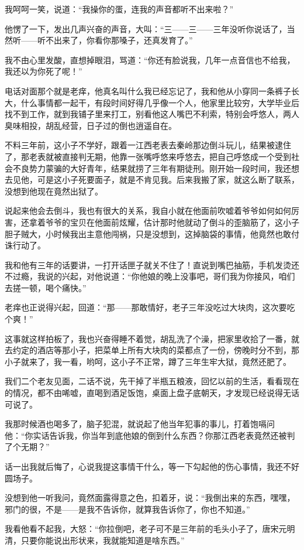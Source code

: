我呵呵一笑，说道：“我操你的蛋，连我的声音都听不出来啦？”

他愣了一下，发出几声兴奋的声音，大叫：“三——三——三年没听你说话了，当然听——听不出来了，你看你那嗓子，还真发育了。”

我不由心里发酸，直想掉眼泪，骂道：“你还有脸说我，几年一点音信也不给我，我还以为你死了呢！”

电话对面那个就是老痒，他真名叫什么我已经忘记了，我和他从小穿同一条裤子长大，什么事情都一起干，有段时间好得几乎像一个人，他家里比较穷，大学毕业后找不到工作，就到我铺子里来打工，别看他这人嘴巴不利索，特别会呼悠人，两人臭味相投，胡乱经营，日子过的倒也逍遥自在。

不料三年前，这小子不学好，跟着一江西老表去秦岭那边倒斗玩儿，结果被逮住了，那老表就被直接判无期，他靠一张嘴呼悠来呼悠去，把自己呼悠成一个受到社会不良势力蒙骗的大好青年，结果就捞了三年有期徒刑。刚开始一段时间，我还想去见他，可是这小子死要面子，就是不肯见我。后来我搬了家，就这么断了联系，没想到他现在竟然出狱了。

说起来他会去倒斗，我也有很大的关系，我自小就在他面前吹嘘着爷爷如何如何厉害，还拿着爷爷的宝贝在他面前炫耀，估计那时他就动了倒斗的歪脑筋了，这小子胆子贼大，小时候我出主意他闯祸，只是没想到，这掉脑袋的事情，他竟然也敢付诛行动了。

我和他有三年的话要讲，一打开话匣子就关不住了！直说到嘴巴抽筋，手机发烫还不过瘾，我说的兴起，对他说道：“你他娘的晚上没事吧，哥们我为你接风，咱们去搓一顿，喝个痛快。”

老痒也正说得兴起，回道：“那——那敢情好，老子三年没吃过大块肉，这次要吃个爽！”

这事就这样拍板了，我也兴奋得睡不着觉，胡乱洗了个澡，把家里收拾了一番，就去约定的酒店等那小子，把菜单上所有大块肉的菜都点了一份，傍晚时分不到，那小子就来了，我一看，哟呵，这小子不正常，蹲了三年生牢大狱，竟然还肥了。

我们二个老友见面，二话不说，先干掉了半瓶五粮液，回忆以前的生活，看看现在的情况，都不由唏嘘，直喝到酒足饭饱，桌面上盘子底朝天，才发现已经说得无话可说了。

我那时候酒也喝多了，脑子犯混，就说起了他当年犯事的事儿，打着饱嗝问他：“你实话告诉我，你当年到底他娘的倒到什么东西？你那江西老表竟然还被判了个无期？”

话一出我就后悔了，心说我提这事情干什么，等一下勾起他的伤心事情，我还不好圆场子。

没想到他一听我问，竟然面露得意之色，扣着牙，说：“我倒出来的东西，嘿嘿，邪门的很，不是——是我不告诉你，就算我告诉你了，你也不知道。”

我看他看不起我，大怒：“你拉倒吧，老子可不是三年前的毛头小子了，唐宋元明清，只要你能说出形状来，我就能知道是啥东西。”


